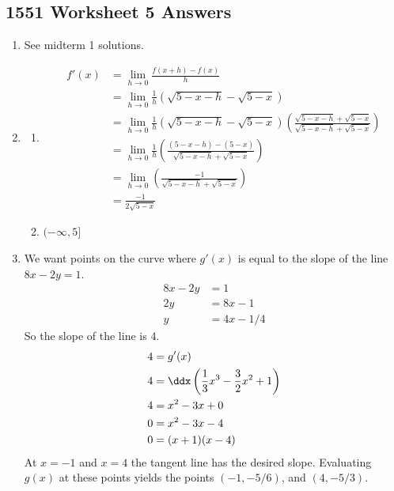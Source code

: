\newpage\subsection*{1551 Worksheet 5 Answers}

\SolutionsStatement

\begin{enumerate}
    
    \item See midterm 1 solutions. 
	\item \begin{enumerate}
    \item \begin{align*} 
    	f'(x) &= \lim_{h\to 0}\frac{f(x+h)-f(x)}{h} \\
        &= \lim_{h\to 0} \frac 1 h \left( \sqrt{5 - x - h} - \sqrt{5-x} \right) \\
        &= \lim_{h\to 0} \frac 1 h \left( \sqrt{5 - x - h} - \sqrt{5-x} \right)\left( \frac{\sqrt{5 - x - h} + \sqrt{5-x}}{ \sqrt{5 - x - h} + \sqrt{5-x} } \right) \\
        &= \lim_{h\to 0} \frac 1 h \left( \frac{(5 - x - h) - (5-x)}{ \sqrt{5 - x - h} + \sqrt{5-x} } \right) \\
        &= \lim_{h\to 0} \left( \frac{-1}{ \sqrt{5 - x - h} + \sqrt{5-x} } \right) \\
        &=  \frac{-1}{ 2\sqrt{5-x} }
    \end{align*}
    
    \item $(-\infty,5]$    
\end{enumerate}
	\item We want points on the curve where $g'(x)$ is equal to the slope of the line $8x - 2y = 1 $.
    \begin{align*}
    	8x - 2y &= 1 \\
        2y &= 8x - 1 \\
        y &= 4x - 1/4
    \end{align*}
    So the slope of the line is 4. 
    \begin{align*}
    	4 &= g'(x) \\
        4 &= \ddx \left(\frac{1}{3}x^3-\frac{3}{2}x^2+1 \right)\\
        4 &= x^2 -3x + 0 \\ 
        0 &= x^2 -3x -4 \\
        0 &= (x+1)(x-4)
    \end{align*}    
    At $x=-1$ and $x=4$ the tangent line has the desired slope. Evaluating $g(x)$ at these points yields the points $(-1,-5/6)$, and $(4,-5/3)$. 
    \newpage 
    

\end{enumerate}
